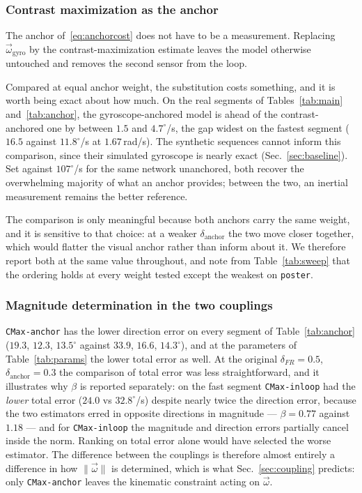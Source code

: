 \documentclass[journal]{IEEEtran}
\newcommand{\wvec}{\vec{\omega}}
\begin{document}
\subsubsection{Contrast maximization as the anchor}
\label{sec:cmax_exp}

The anchor of~\eqref{eq:anchorcost} does not have to be a measurement. Replacing
$\wvec_{\text{gyro}}$ by the contrast-maximization estimate leaves the model
otherwise untouched and removes the second sensor from the loop.

Compared at equal anchor weight, the substitution costs something, and it is
worth being exact about how much. On the real segments of
Tables~\ref{tab:main} and~\ref{tab:anchor}, the gyroscope-anchored model is
ahead of the contrast-anchored one by between $1.5$ and $4.7^\circ$/s, the gap
widest on the fastest segment ($16.5$ against $11.8^\circ$/s at
$1.67$\,rad/s). The synthetic sequences cannot inform this comparison, since
their simulated gyroscope is nearly exact (Sec.~\ref{sec:baseline}). Set against $107^\circ$/s for the same network
unanchored, both recover the overwhelming majority of what an anchor provides;
between the two, an inertial measurement remains the better reference.

The comparison is only meaningful because both anchors carry the same weight,
and it is sensitive to that choice: at a weaker $\delta_{\text{anchor}}$ the two
move closer together, which would flatter the visual anchor rather than inform
about it. We therefore report both at the same value throughout, and note from
Table~\ref{tab:sweep} that the ordering holds at every weight tested except
the weakest on \texttt{poster}.

\subsubsection{Magnitude determination in the two couplings}
\texttt{CMax-anchor} has the lower direction error on every segment of
Table~\ref{tab:anchor} ($19.3$, $12.3$, $13.5^\circ$ against $33.9$, $16.6$,
$14.3^\circ$), and at the parameters of Table~\ref{tab:params} the lower total
error as well. At the original $\delta_{F\!R} = 0.5$,
$\delta_{\text{anchor}} = 0.3$ the comparison of total error was less
straightforward, and it illustrates why $\beta$ is reported separately: on the
fast segment \texttt{CMax-inloop} had the \emph{lower} total error ($24.0$ vs
$32.8^\circ$/s) despite nearly twice the direction error, because the two
estimators erred in opposite directions in magnitude --- $\beta = 0.77$
against $1.18$ --- and for \texttt{CMax-inloop} the magnitude and direction
errors partially cancel inside the norm. Ranking on total error alone would
have selected the worse estimator. The
difference between the couplings is therefore almost entirely a difference in
how $\|\wvec\|$ is determined, which is what Sec.~\ref{sec:coupling} predicts:
only \texttt{CMax-anchor} leaves the kinematic constraint acting on $\wvec$.
\end{document}
